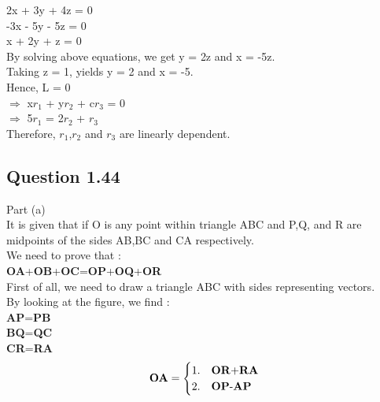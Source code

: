 \documentclass{article}
\begin{document}
    2x + 3y + 4z = 0\\
    
   -3x - 5y - 5z = 0\\
    
    x + 2y + z = 0\\
    
    By solving above equations, we get y = 2z and x = -5z.\\
    
    Taking z = 1, yields y = 2 and x = -5.\\
    
    Hence,
    L = 0 \\
$\Rightarrow$ x\textbf{$r_{1}$} + y\textbf{$r_{2}$} + c\textbf{$r_{3}$} = 0\\

$\Rightarrow$ 5\textbf{$r_{1}$} = 2\textbf{$r_{2}$} + \textbf{$r_{3}$} \\

    Therefore, \textbf{$r_{1}$},\textbf{$r_{2}$} and \textbf{$r_{3}$} are linearly dependent.
    
    
    \subsection{Question 1.44}
    
    Part (a) \\
    
    It is given that if O is any point within triangle ABC and P,Q, and R are midpoints of the sides AB,BC and CA respectively.\\
    
    We need to prove that :\\
    \textbf{OA}+\textbf{OB}+\textbf{OC}=\textbf{OP}+\textbf{OQ}+\textbf{OR}\\
    
    First of all, we need to draw a triangle ABC with sides representing vectors.\\
    
    By looking at the figure, we find : \\
    
    \textbf{AP}=\textbf{PB}\\
    
    \textbf{BQ}=\textbf{QC}\\
    
    \textbf{CR}=\textbf{RA}\\
    
    
\[
    \textbf{OA} =
    \begin{cases}
    		1. & \text{\textbf{OR}+\textbf{RA}}\\
    		2. & \text{\textbf{OP}-\textbf{AP}}
    \end{cases}
\]
\end{document}
